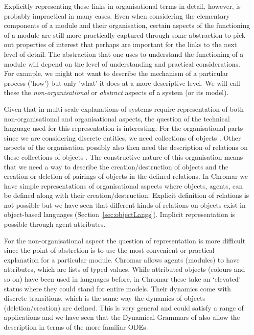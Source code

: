 \documentclass[phd]{infthesis}
\begin{document}
Explicitly representing these links in organisational terms in detail, however,
is probably impractical in many cases. Even when considering the elementary
components of a module and their organisation, certain aspects of the
functioning of a module are still more practically captured through some
abstraction to pick out properties of interest that perhaps are important for
the links to the next level of detail. The abstraction that one uses to
understand the functioning of a module will depend on the level of understanding
and practical considerations. For example, we might not want to describe the
mechanism of a particular process ('how') but only 'what' it does at a more
descriptive level.  We will call these the \emph{non-organisational} or
\emph{abstract} aspects of a system (or its model).

Given that in multi-scale explanations of systems require representation of both
non-organisational and organisational aspects, the question of the technical
language used for this representation is interesting. For the organisational
parts since we are considering discrete entities, we need collections of objects
\citep{fontana_barrier_1996}. Other aspects of the organisation possibly also
then need the description of relations on these collections of objects
\citep{rashevsky_topology_1954, rosen_relational_1958}. The constructive nature
of this organisation means that we need a way to describe the
creation/destruction of objects and the creation or deletion of pairings of
objects in the defined relations. In Chromar we have simple representations of
organisational aspects where objects, agents, can be defined along with their
creation/destruction. Explicit definition of relations is not possible but we
have seen that different kinds of relations on objects exist in object-based
languages (Section~\ref{sec:objectLangs}). Implicit representation is possible
through agent attributes.

For the non-organisational aspect the question of representation is more
difficult since the point of abstrction is to use the most convenient or
practical explanation for a particular module. Chromar allows agents (modules)
to have attributes, which are lists of typed values. While attributed objects
(colours and so on) have been used in languages before, in Chromar these take an
`elevated' status where they could stand for entire models. Their dynamics come with
discrete transitions, which is the same way the dynamics of objects
(deletion/creation) are defined. This is very general and could satisfy a range
of applications and we have seen that the Dynamical Grammars of
\citet{mjolsness2006stochastic} also allow the description in terms of the more
familiar ODEs. 
\end{document}
